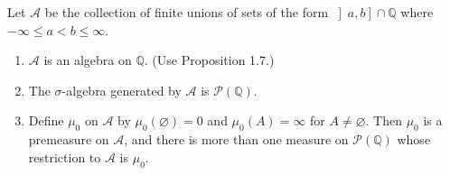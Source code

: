 \begin{exercise}
    Let \( \mathcal{A} \) be the collection of finite unions of sets of the form \( \left\rbrack a, b \right\rbrack \cap \mathbb{Q} \) where \( -\infty \le a < b \le \infty \).
    \begin{enumerate}[itemsep=0pt,label=\textbf{\alph*.}]
        \item \( \mathcal{A} \) is an algebra on \( \mathbb{Q} \). (Use Proposition 1.7.)
        \item The \( \sigma \)-algebra generated by \( \mathcal{A} \) is \( \mathcal{P}(\mathbb{Q}) \).
        \item Define \( \mu_{0} \) on \( \mathcal{A} \) by \( \mu_{0}(\varnothing) = 0 \) and \( \mu_{0}(A) = \infty \) for \( A \ne \varnothing \). Then \( \mu_{0} \) is a premeasure on \( \mathcal{A} \), and there is more than one measure on \( \mathcal{P}(\mathbb{Q}) \) whose restriction to \( \mathcal{A} \) is \( \mu_{0} \).
    \end{enumerate}
\end{exercise}

